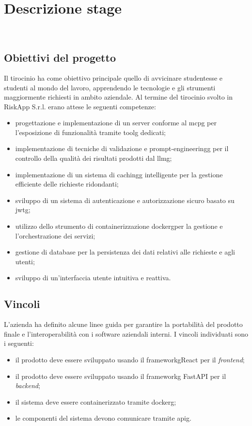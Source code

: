 \chapter{Descrizione stage}
\label{cap:descrizione-stage}

\\

\section{Obiettivi del progetto}
Il tirocinio ha come obiettivo principale quello di avvicinare studentesse e 
studenti al mondo del lavoro, apprendendo le tecnologie e gli strumenti 
maggiormente richiesti in ambito aziendale.
Al termine del tirocinio svolto in RiskApp S.r.l. erano attese le seguenti competenze:
\begin{itemize}
    \item progettazione e implementazione di un server conforme al \gls{mcpg} per l'esposizione
    di funzionalità tramite \gls{toolg} dedicati;
    \item implementazione di tecniche di validazione e \gls{prompt-engineeringg} per 
    il controllo della qualità dei risultati prodotti dal \gls{llmg}\glsfirstoccur ;
    \item implementazione di un sistema di \gls{cachingg} intelligente per la gestione 
    efficiente delle richieste ridondanti;
    \item sviluppo di un sistema di autenticazione e autorizzazione sicuro 
    basato su \gls{jwtg}\glsfirstoccur ;
    \item utilizzo dello strumento di containerizzazione \gls{dockerg}\glsfirstoccur per la gestione 
    e l'orchestrazione dei servizi;
    \item gestione di database per la persistenza dei dati relativi alle richieste 
    e agli utenti;
    \item sviluppo di un'interfaccia utente intuitiva e reattiva.
\end{itemize}

\section{Vincoli}
L'azienda ha definito alcune linee guida per 
garantire la portabilità del prodotto finale e l'interoperabilità con i software 
aziendali interni. I vincoli individuati sono i seguenti:
\begin{itemize}
    \item il prodotto deve essere sviluppato usando il \gls{frameworkg}\glsfirstoccur  React 
    per il \textit{frontend};
    \item il prodotto deve essere sviluppato usando il \gls{frameworkg} FastAPI
    per il \textit{backend};
    \item il sistema deve essere containerizzato tramite \gls{dockerg};
    \item le componenti del sistema devono comunicare tramite \gls{apig}\glsfirstoccur .
\end{itemize}

